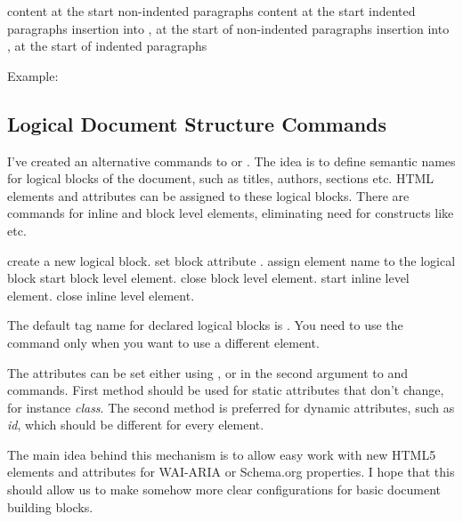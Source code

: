  {content at the start non-indented paragraphs} 
   {content at the start indented paragraphs}
   {insertion into , at the start of non-indented paragraphs}
   {insertion into , at the start of indented paragraphs}\EndDoc

Example:

\begin{texsource}
{\EndP{}}
{\EndP{}}
{}
{}
\end{texsource}



\subsection{Logical Document Structure Commands}
I've created an alternative commands to  or . 
The idea is to define semantic names for logical blocks of the document, such as titles, authors,
sections etc. HTML elements and attributes can be assigned to these
logical blocks. There are commands for inline and block level elements,
eliminating need for constructs like \texcommand{\ifvmode\IgnorePar\fi\EndP}
etc.

 create a new logical block.
 set block attribute .
 assign element name to the logical block
 start block level element.
 close block level element.
 start inline level element.
 close inline level element.


The default tag name for declared logical blocks is . You
need to use the  command only when you want to use a different
element.

The attributes can be set either using , or in the second
argument to   and  commands. First method should be
used for static attributes that don't change, for instance \textit{class}. The second method
is preferred for dynamic attributes, such as \textit{id}, which should be different for 
every element.

The main idea behind this mechanism is to allow easy work with new HTML5
elements and attributes for WAI-ARIA or Schema.org properties. I hope that
this should allow us to make somehow more clear configurations for basic
document building blocks.

